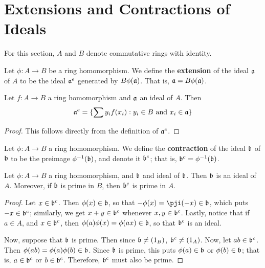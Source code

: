 \section{Extensions and Contractions of Ideals}

For this section, $A$ and  $B$ denote commutative rings with identity.

\begin{definition}
    Let $\phi:A \xrightarrow{} B$ be a ring homomorphism. We define the
    \textbf{extension} of the ideal $\af$ of  $A$ to be the ideal $\af^e$
    generated by $B\phi(\af)$. That is, $\af=B\phi(\af)$.
\end{definition}

\begin{lemma}\label{1.10.1}
    Let $f:A \xrightarrow{} B$ a ring homomorphism and $\af$ an ideal of $A$.
    Then
    \begin{equation*}
        \af^e=\{\sum{y_if(x_i) : y_i \in B \text{ and } x_i \in \af}\}
    \end{equation*}
\end{lemma}
\begin{proof}
    This follows directly from the definition of $\af^e$.
\end{proof}

\begin{definition}
    Let $\phi:A \xrightarrow{} B$ a ring homomorphism. We define the
    \textbf{contraction} of the ideal $\bf$ of  $\bf$ to be the preimage
    $\inv{\phi}(\bf)$, and denote it $\bf^c$; that is,  $\bf^c=\inv{\phi}(\bf)$.
\end{definition}

\begin{lemma}\label{1.10.2}
    Let $\phi:A \xrightarrow{} B$ a ring homomorphism, and $\bf$ and ideal of
    $\bf$. Then $\bf$ is an ideal of $A$. Moreover, if $\bf$ is prime in $B$,
    then  $\bf^c$ is prime in $A$.
\end{lemma}
\begin{proof}
    Let $x \in \bf^c$. Then  $\phi(x) \in \bf$, so that $-\phi(x)=\pji(-x) \in
    \bf$, which puts $-x \in \bf^c$; similarly, we get $x+y \in \bf^c$ whenever
    $x,y \in \bf^c$. Lastly, notice that if  $a \in A$, and  $x \in \bf^c$, then
     $\phi(a)\phi(x)=\phi(ax) \in \bf$, so that $\bf^c$ is an ideal.

     Now, suppose that  $\bf$ is prime. Then since  $\bf \neq (1_B)$, $\bf^c
     \neq (1_A)$. Now, let $ab \in \bf^c$. Then  $\phi(ab)=\phi(a)\phi(b) \in
     \bf$. Since $\bf$ is prime, this puts  $\phi(a) \in \bf$ or $\phi(b) \in
     \bf$; that is, $a \in \bf^c$ or  $b \in \bf^c$. Therefore, $\bf^c$ must
     also be prime.
\end{proof}

